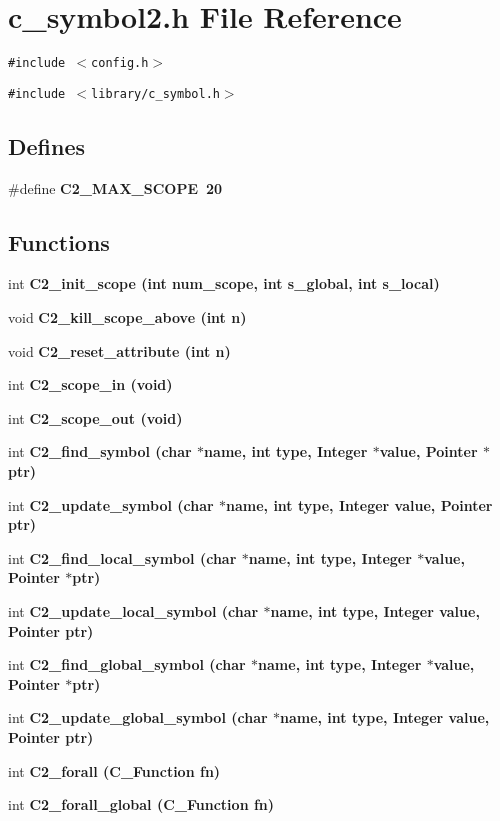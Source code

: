 \section{c\_\-symbol2.h File Reference}
\label{c__symbol2_8h}
{\tt \#include $<$config.h$>$}\par
{\tt \#include $<$library/c\_\-symbol.h$>$}\par
\subsection*{Defines}
\begin{CompactItemize}
\item 
\#define \bf{C2\_\-MAX\_\-SCOPE}~20
\end{CompactItemize}
\subsection*{Functions}
\begin{CompactItemize}
\item 
int \bf{C2\_\-init\_\-scope} (int num\_\-scope, int s\_\-global, int s\_\-local)
\item 
void \bf{C2\_\-kill\_\-scope\_\-above} (int n)
\item 
void \bf{C2\_\-reset\_\-attribute} (int n)
\item 
int \bf{C2\_\-scope\_\-in} (void)
\item 
int \bf{C2\_\-scope\_\-out} (void)
\item 
int \bf{C2\_\-find\_\-symbol} (char $\ast$\bf{name}, int type, \bf{Integer} $\ast$value, \bf{Pointer} $\ast$ptr)
\item 
int \bf{C2\_\-update\_\-symbol} (char $\ast$\bf{name}, int type, \bf{Integer} value, \bf{Pointer} ptr)
\item 
int \bf{C2\_\-find\_\-local\_\-symbol} (char $\ast$\bf{name}, int type, \bf{Integer} $\ast$value, \bf{Pointer} $\ast$ptr)
\item 
int \bf{C2\_\-update\_\-local\_\-symbol} (char $\ast$\bf{name}, int type, \bf{Integer} value, \bf{Pointer} ptr)
\item 
int \bf{C2\_\-find\_\-global\_\-symbol} (char $\ast$\bf{name}, int type, \bf{Integer} $\ast$value, \bf{Pointer} $\ast$ptr)
\item 
int \bf{C2\_\-update\_\-global\_\-symbol} (char $\ast$\bf{name}, int type, \bf{Integer} value, \bf{Pointer} ptr)
\item 
int \bf{C2\_\-forall} (\bf{C\_\-Function} fn)
\item 
int \bf{C2\_\-forall\_\-global} (\bf{C\_\-Function} fn)
\end{CompactItemize}


